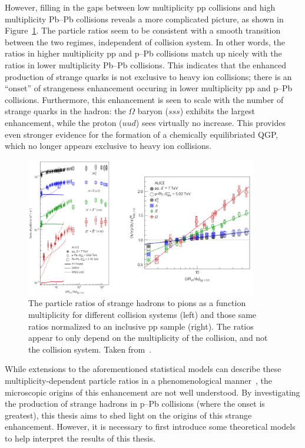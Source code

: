  However, filling in the gaps between low multiplicity pp collisions and high multiplicity Pb--Pb collisions reveals a more complicated picture, as shown in Figure~\ref{fig:strangeness_enhancement}. The particle ratios seem to be consistent with a smooth transition between the two regimes, independent of collision system. In other words, the ratios in higher multiplicity pp and p--Pb collisions match up nicely with the ratios in lower multiplicity Pb--Pb collisions. This indicates that the enhanced production of strange quarks is not exclusive to heavy ion collisions; there is an ``onset'' of strangeness enhancement occuring in lower multiplicity pp and p--Pb collisions. Furthermore, this enhancement is seen to scale with the number of strange quarks in the hadron: the $\Omega$ baryon ($sss$) exhibits the largest enhancement, while the proton ($uud$) sees virtually no increase. This provides even stronger evidence for the formation of a chemically equilibriated QGP, which no longer appears exclusive to heavy ion collisions.

 \begin{figure}
    \centering
    \includegraphics[width=0.9\textwidth]{figures/introduction/strangeness_enhancement.png}
    \caption{The particle ratios of strange hadrons to pions as a function multiplicity for different collision systems (left) and those same ratios normalized to an inclusive pp sample (right). The ratios appear to only depend on the multiplicity of the collision, and not the collision system. Taken from~\cite{NATURE}.}
    \label{fig:strangeness_enhancement}
\end{figure}
 
While extensions to the aforementioned statistical models can describe these multiplicity-dependent particle ratios in a phenomenological manner~\cite{NATURE17}, the microscopic origins of this enhancement are not well understood. By investigating the production of strange hadrons in p--Pb collisions (where the onset is greatest), this thesis aims to shed light on the origins of this strange enhancement. However, it is necessary to first introduce some theoretical models to help interpret the results of this thesis.


